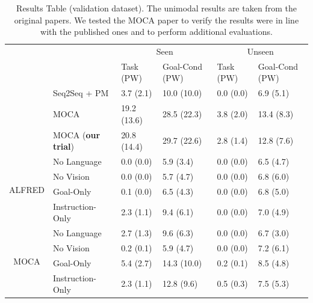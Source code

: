 \documentclass[11pt,a4paper]{article}
\begin{document}



\begin{table}[]
\begin{tabular}{ll|l|l|l|l|}
\cline{3-6}
                                              &                  & \multicolumn{2}{c|}{Seen}    & \multicolumn{2}{c|}{Unseen} \\ \cline{3-6} 
                                              &                  & Task (PW)   & Goal-Cond (PW) & Task (PW)  & Goal-Cond (PW) \\ \cline{2-6} 
\multicolumn{1}{l|}{}                         & Seq2Seq + PM     & 3.7 (2.1)   & 10.0 (10.0)    & 0.0 (0.0)  & 6.9 (5.1)      \\ \cline{2-6} 
\multicolumn{1}{l|}{}                         & MOCA             & 19.2 (13.6) & 28.5 (22.3)    & 3.8 (2.0)  & 13.4 (8.3)     \\ \cline{2-6} 
\multicolumn{1}{l|}{}                         & MOCA (\textbf{our trial}) & 20.8 (14.4) & 29.7 (22.6)    & 2.8 (1.4)  & 12.8 (7.6)     \\ \hline  \hline
\multicolumn{1}{|l|}{\multirow{4}{*}{ALFRED}} & No Language      & 0.0 (0.0)   & 5.9 (3.4)      & 0.0 (0.0)  & 6.5 (4.7)      \\ \cline{2-6} 
\multicolumn{1}{|l|}{}                        & No Vision        & 0.0 (0.0)   & 5.7 (4.7)      & 0.0 (0.0)  & 6.8 (6.0)      \\ \cline{2-6} 
\multicolumn{1}{|l|}{}                        & Goal-Only        & 0.1 (0.0)   & 6.5 (4.3)      & 0.0 (0.0)  & 6.8 (5.0)      \\ \cline{2-6} 
\multicolumn{1}{|l|}{}                        & Instruction-Only & 2.3 (1.1)   & 9.4 (6.1)      & 0.0 (0.0)  & 7.0 (4.9)      \\ \hline\hline
\multicolumn{1}{|c|}{\multirow{4}{*}{MOCA}}   & No Language      & 2.7 (1.3)   & 9.6 (6.3)      & 0.0 (0.0)  & 6.7 (3.0)      \\ \cline{2-6} 
\multicolumn{1}{|c|}{}                        & No Vision        & 0.2 (0.1)   & 5.9 (4.7)      & 0.0 (0.0)  & 7.2 (6.1)      \\ \cline{2-6} 
\multicolumn{1}{|c|}{}                        & Goal-Only        & 5.4 (2.7)   & 14.3 (10.0)    & 0.2 (0.1)  & 8.5 (4.8)      \\ \cline{2-6} 
\multicolumn{1}{|c|}{}                        & Instruction-Only & 2.3 (1.1)   & 12.8 (9.6)     & 0.5 (0.3)  & 7.5 (5.3)      \\ \hline

\end{tabular}
\caption{Results Table (validation dataset). The unimodal results are taken from the original papers. We tested the MOCA paper to verify the results were in line with the published ones and to perform additional evaluations.}
\label{tab:results}
\end{table}
\end{document}
